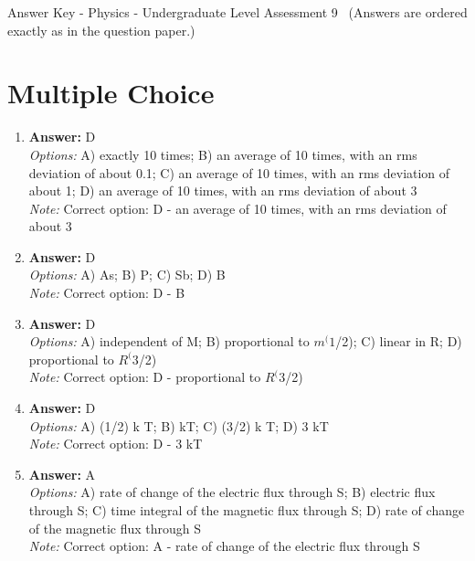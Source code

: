 \documentclass[12pt]{article}
\begin{document}
\begin{center}
Answer Key - Physics - Undergraduate Level Assessment 9 \
\small (Answers are ordered exactly as in the question paper.)
\end{center}

\section*{Multiple Choice}
\begin{enumerate}[label=\arabic*.]
\item \textbf{Answer:} D
\\ \textit{Options:} A) exactly 10 times; B) an average of 10 times, with an rms deviation of about 0.1; C) an average of 10 times, with an rms deviation of about 1; D) an average of 10 times, with an rms deviation of about 3
\\ \textit{Note:} Correct option: D - an average of 10 times, with an rms deviation of about 3
\item \textbf{Answer:} D
\\ \textit{Options:} A) As; B) P; C) Sb; D) B
\\ \textit{Note:} Correct option: D - B
\item \textbf{Answer:} D
\\ \textit{Options:} A) independent of M; B) proportional to $m^(1$/2); C) linear in R; D) proportional to $R^(3$/2)
\\ \textit{Note:} Correct option: D - proportional to $R^(3$/2)
\item \textbf{Answer:} D
\\ \textit{Options:} A) (1/2) k T; B) kT; C) (3/2) k T; D) 3 kT
\\ \textit{Note:} Correct option: D - 3 kT
\item \textbf{Answer:} A
\\ \textit{Options:} A) rate of change of the electric flux through S; B) electric flux through S; C) time integral of the magnetic flux through S; D) rate of change of the magnetic flux through S
\\ \textit{Note:} Correct option: A - rate of change of the electric flux through S
\end{enumerate}
\end{document}
